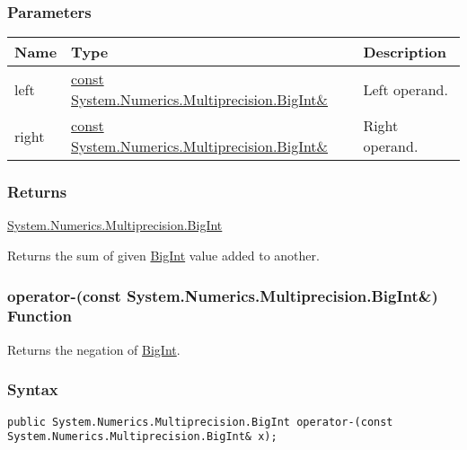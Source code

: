 \documentclass[a4paper,oneside,11.000000pt]{book}
\begin{document}
\subsubsection*{Parameters}
\begin{flushleft}
\begin{supertabular}[l]{!{\raggedright}p{1.30721cm}!{\raggedright}p{8.55945cm}!{\raggedright}p{3.66839cm}}
\textbf{Name}
& \textbf{Type}
& \textbf{Description}
\\
\hline
left
& \hyperlink{System.Numerics.Multiprecision.BigInt}{const System.\-Numerics.\-Multiprecision.\-BigInt\&\-}
& Left operand.

\\
right
& \hyperlink{System.Numerics.Multiprecision.BigInt}{const System.\-Numerics.\-Multiprecision.\-BigInt\&\-}
& Right operand.

\\
\end{supertabular}

\end{flushleft}
\subsubsection*{Returns}
\hyperlink{System.Numerics.Multiprecision.BigInt}{System.\-Numerics.\-Multiprecision.\-BigInt}
\begin{flushleft}
Returns the sum of given \hyperlink{System.Numerics.Multiprecision.BigInt}{BigInt} value added to another.

\end{flushleft}
\clearpage

\hypertarget{System.Numerics.Multiprecision.operator.minus.C.R.System.Numerics.Multiprecision.BigInt}{\subsubsection*{operator-(const System.Numerics.Multiprecision.BigInt\&) Function}}
\begin{flushleft}
Returns the negation of \hyperlink{System.Numerics.Multiprecision.BigInt}{BigInt}.

\end{flushleft}
\subsubsection*{Syntax}
\texttt{public System.Numerics.Multiprecision.BigInt operator-(const System.Numerics.Multiprecision.BigInt\& x);}
\end{document}
